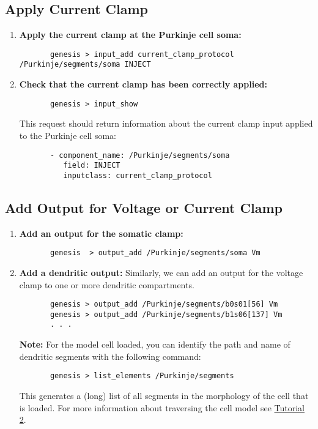 \documentclass[12pt]{article}
\begin{document}
\subsection*{Apply Current Clamp}

\begin{enumerate}	
	\item{\bf Apply the current clamp at the Purkinje cell soma:}
	\begin{verbatim}
	   genesis > input_add current_clamp_protocol /Purkinje/segments/soma INJECT
	\end{verbatim}
	
	\item{\bf Check that the current clamp has been correctly applied:}
	\begin{verbatim}
	   genesis > input_show
	\end{verbatim}
	This request should return information about the current clamp input applied to the Purkinje cell soma:
	\begin{verbatim}
	   - component_name: /Purkinje/segments/soma
	      field: INJECT
	      inputclass: current_clamp_protocol
	   \end{verbatim}
\end{enumerate}

\subsection*{Add Output for Voltage or Current Clamp}

\begin{enumerate}
	\item{\bf Add an output for the somatic clamp:}
	\begin{verbatim}
	   genesis  > output_add /Purkinje/segments/soma Vm
	\end{verbatim}
	
	\item{\bf Add a dendritic output:} Similarly, we can add an output for the voltage clamp to one or more dendritic compartments.
	\begin{verbatim}
	   genesis > output_add /Purkinje/segments/b0s01[56] Vm
	   genesis > output_add /Purkinje/segments/b1s06[137] Vm
	   . . .
	\end{verbatim}
	{\bf Note:} For the model cell loaded, you can identify the path and name of dendritic segments with the following command:
	\begin{verbatim}
	   genesis > list_elements /Purkinje/segments
	\end{verbatim}	
	This generates a (long) list of all segments in the morphology of the cell that is loaded. For more information about traversing the cell model see \href{../tutorial2/tutorial2.tex}{Tutorial 2}.
\end{enumerate}
\end{document}
